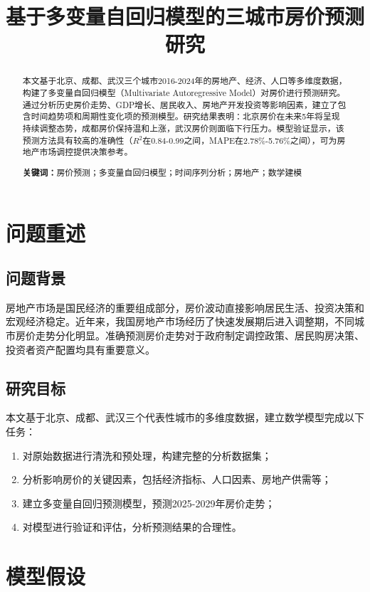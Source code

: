 \documentclass[12pt,a4paper]{article}
\date{}
\title{\textbf{基于多变量自回归模型的三城市房价预测研究}}
\author{}
\date{}
\begin{document}
\maketitle

\begin{abstract}
本文基于北京、成都、武汉三个城市2016-2024年的房地产、经济、人口等多维度数据，构建了多变量自回归模型（Multivariate Autoregressive Model）对房价进行预测研究。通过分析历史房价走势、GDP增长、居民收入、房地产开发投资等影响因素，建立了包含时间趋势项和周期性变化项的预测模型。研究结果表明：北京房价在未来5年将呈现持续调整态势，成都房价保持温和上涨，武汉房价则面临下行压力。模型验证显示，该预测方法具有较高的准确性（$R^2$在0.84-0.99之间，MAPE在2.78\%-5.76\%之间），可为房地产市场调控提供决策参考。

\textbf{关键词：}房价预测；多变量自回归模型；时间序列分析；房地产；数学建模
\end{abstract}

\section{问题重述}

\subsection{问题背景}
房地产市场是国民经济的重要组成部分，房价波动直接影响居民生活、投资决策和宏观经济稳定。近年来，我国房地产市场经历了快速发展期后进入调整期，不同城市房价走势分化明显。准确预测房价走势对于政府制定调控政策、居民购房决策、投资者资产配置均具有重要意义。

\subsection{研究目标}
本文基于北京、成都、武汉三个代表性城市的多维度数据，建立数学模型完成以下任务：
\begin{enumerate}
    \item 对原始数据进行清洗和预处理，构建完整的分析数据集；
    \item 分析影响房价的关键因素，包括经济指标、人口因素、房地产供需等；
    \item 建立多变量自回归预测模型，预测2025-2029年房价走势；
    \item 对模型进行验证和评估，分析预测结果的合理性。
\end{enumerate}

\section{模型假设}
\end{document}
